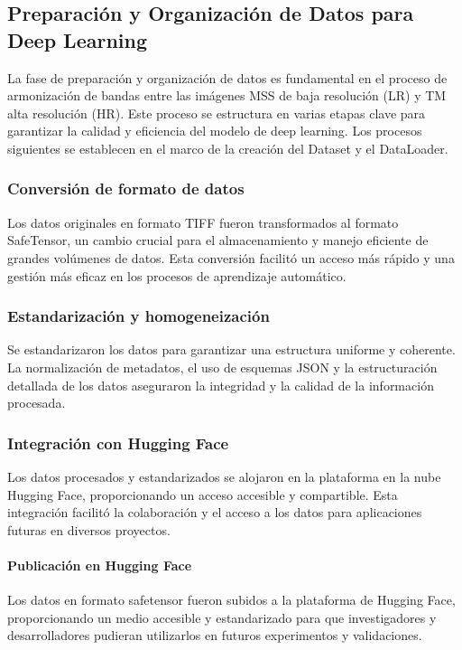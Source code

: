         \subsection{Preparación y Organización de Datos para Deep Learning}
            La fase de preparación y organización de datos es fundamental en el proceso de armonización de bandas entre las imágenes MSS de baja resolución (LR) y TM alta resolución (HR). Este proceso se estructura en varias etapas clave para garantizar la calidad y eficiencia del modelo de deep learning. Los procesos siguientes se establecen en el marco de la creación del Dataset y el DataLoader.

            \subsubsection{Conversión de formato de datos}
                Los datos originales en formato TIFF fueron transformados al formato SafeTensor, un cambio crucial para el almacenamiento y manejo eficiente de grandes volúmenes de datos. Esta conversión facilitó un acceso más rápido y una gestión más eficaz en los procesos de aprendizaje automático.

            \subsubsection{Estandarización y homogeneización}
                Se estandarizaron los datos para garantizar una estructura uniforme y coherente. La normalización de metadatos, el uso de esquemas JSON y la estructuración detallada de los datos aseguraron la integridad y la calidad de la información procesada.

            \subsubsection{Integración con Hugging Face}
                Los datos procesados y estandarizados se alojaron en la plataforma en la nube Hugging Face, proporcionando un acceso accesible y compartible. Esta integración facilitó la colaboración y el acceso a los datos para aplicaciones futuras en diversos proyectos.
            

                \paragraph{Publicación en Hugging Face}
                    Los datos en formato safetensor fueron subidos a la plataforma de Hugging Face, proporcionando un medio accesible y estandarizado para que investigadores y desarrolladores pudieran utilizarlos en futuros experimentos y validaciones.

